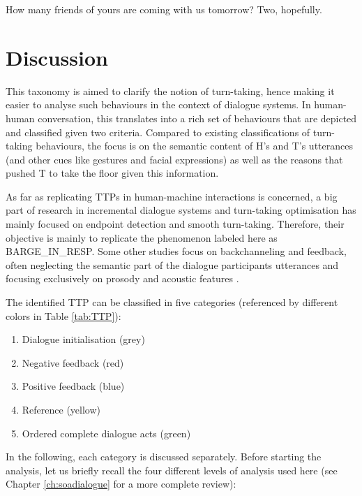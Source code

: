                     	\begin{dialogue}
							 How many friends of yours are coming with us tomorrow?
							 Two, hopefully.
						\end{dialogue}

\section{Discussion}
\label{sec:discussion}

	This taxonomy is aimed to clarify the notion of turn-taking, hence making it easier to analyse such behaviours in the context of dialogue systems. In human-human conversation, this translates into a rich set of behaviours that are depicted and classified given two criteria. Compared to existing classifications of turn-taking behaviours, the focus is on the semantic content of H's and T's utterances (and other cues like gestures and facial expressions) as well as the reasons that pushed T to take the floor given this information.

    As far as replicating TTPs in human-machine interactions is concerned, a big part of research in incremental dialogue systems and turn-taking optimisation has mainly focused on endpoint detection \cite{Raux2008} and smooth turn-taking. Therefore, their objective is mainly to replicate the phenomenon labeled here as BARGE\_IN\_RESP. Some other studies focus on backchanneling and feedback, often neglecting the semantic part of the dialogue participants utterances and focusing exclusively on prosody and acoustic features \cite{Baumann2008,Jonsdottir2008}.

    The identified TTP can be classified in five categories (referenced by different colors in Table \ref{tab:TTP}):
    
    \begin{enumerate}
      \item Dialogue initialisation (grey)
      \item Negative feedback (red)
      \item Positive feedback (blue)
      \item Reference (yellow)
      \item Ordered complete dialogue acts (green)
    \end{enumerate}

    In the following, each category is discussed separately. Before starting the analysis, let us briefly recall the four different levels of analysis used here (see Chapter \ref{ch:soadialogue} for a more complete review):
		
